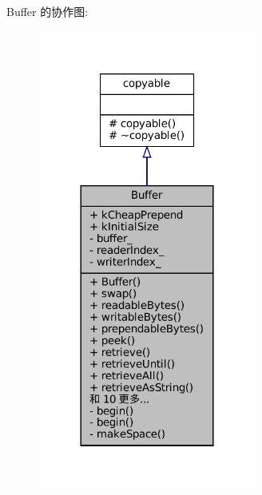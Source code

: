 Buffer 的协作图\+:
\nopagebreak
\begin{figure}[H]
\begin{center}
\leavevmode
\includegraphics[width=204pt]{classmuduo_1_1Buffer__coll__graph}
\end{center}
\end{figure}
